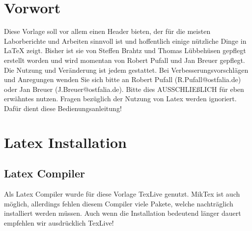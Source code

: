 
% 


	
	
	
	
	
	\tableofcontents
	\newpage
	\section{Vorwort}
	Diese Vorlage soll vor allem einen Header bieten, der für die meisten Laborberichte und Arbeiten sinnvoll ist und hoffentlich einige nützliche Dinge in LaTeX zeigt.\newline
	Bisher ist sie von Steffen Brahtz und Thomas Lübbehüsen gepflegt erstellt worden und wird momentan von Robert Pufall und Jan Breuer gepflegt.\newline
	Die Nutzung und Veränderung ist jedem gestattet. Bei Verbesserungsvorschlägen und Anregungen wenden Sie sich bitte an Robert Pufall (R.Pufall@ostfalia.de) oder Jan Breuer (J.Breuer@ostfalia.de).
	Bitte dies AUSSCHLIEßLICH für eben erwähntes nutzen. Fragen bezüglich der Nutzung von Latex werden ignoriert. Dafür dient diese Bedienungsanleitung!
	
	
	\section{Latex Installation}
	\subsection{Latex Compiler}
	Als Latex Compiler wurde für diese Vorlage TexLive genutzt. MikTex ist auch möglich, allerdings fehlen diesem Compiler viele Pakete, welche nachträglich installiert werden müssen.\newline
	Auch wenn die Installation bedeutend länger dauert empfehlen wir ausdrücklich TexLive!

